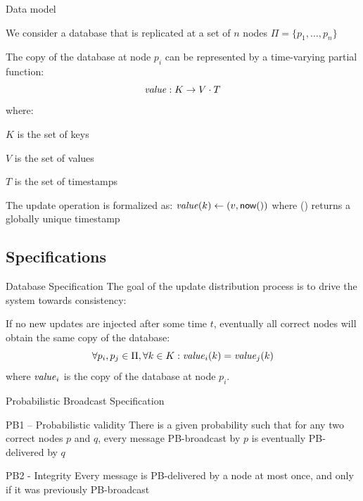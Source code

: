 \begin{frame}{Data model}

\BIL	
\item We consider a database that is replicated at a set of $n$ nodes $\Pi =
\{ p_1, \ldots, p_n \}$
\item The copy of the database at node $p_i$ can be represented by a
time-varying partial function:
\[
  \mathit{value}: K \rightarrow V \cdot T
\]
where:
\BI
\item $K$ is the set of \alert{keys}
\item $V$ is the set of \alert{values}
\item $T$ is the set of \alert{timestamps}
\EI
\item The update operation is formalized as: $\mathit{value}(k) \gets (v, \textsf{{now}}())$
where \Now() returns a globally unique timestamp 
\EIL

\end{frame}

\subsection{Specifications}

\begin{frame}{Database Specification}
The goal of the update distribution process is to drive the system towards consistency:

\bigskip
\begin{definition}
If no new updates are injected after some time $t$, eventually all correct nodes will
obtain the same copy of the database:
\[
 \forall p_i, p_j \in \Pi, \forall k \in K : \mathit{value}_i(k) = \mathit{value}_j(k)
\]
where $\mathit{value}_i$ is the copy of the database at node $p_i$.
\end{definition}


\end{frame}

	
\begin{frame}{Probabilistic Broadcast Specification}

	
\bigskip
\begin{block}{PB1 – \alert{Probabilistic validity}}
There is a given probability such that for any two correct nodes $p$ and
$q$, every message PB-broadcast by $p$ is eventually PB-delivered by $q$
\end{block}

\bigskip
\begin{block}{PB2 - \alert{Integrity}}
Every message is PB-delivered by a node at most once, and only if it was previously PB-broadcast
\end{block}

\end{frame}

